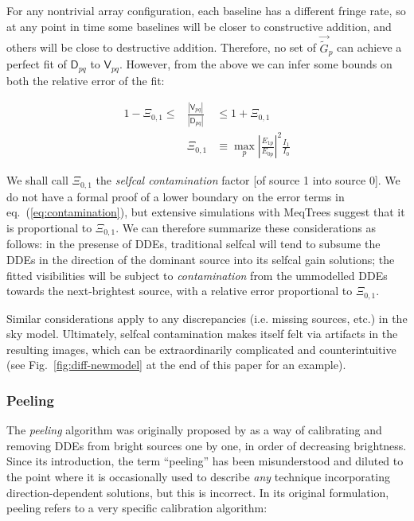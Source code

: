 \documentclass[]{aa}
\newcommand{\jones}[2]{\vec {#1}_{#2}}
\newcommand{\coh}[2]{\mathsf{{#1}}_{{#2}}}
\begin{document}
For any nontrivial array configuration, each baseline has a different fringe rate, so at any point in time some baselines will be closer to constructive addition, and others will be close to destructive addition. Therefore, no set of
$\jones{\tilde G}{p}$ can achieve a perfect fit of $\coh{D}{pq}$ to $\coh{V}{pq}$. However, from the above we can infer some bounds on both the relative error of the fit:

\begin{eqnarray}\label{eq:contamination}
1 -\Xi_{0,1} \le & { \displaystyle \frac{|\coh{V}{pq}|}{|\coh{D}{pq}|} } & \le 1 + \Xi_{0,1} \\
\nonumber & \Xi_{0,1} & \equiv \max_p \left| \frac{E_{1p}}{E_{0p}} \right|^2\frac{I_1}{I_0}
\end{eqnarray}

We shall call $\Xi_{0,1}$ the \emph{selfcal contamination} factor [of source 1 into source 0]. We do not have a formal proof of a lower boundary on the error terms in eq.~(\ref{eq:contamination}), but extensive simulations with MeqTrees suggest that it is proportional to $\Xi_{0,1}$. We can therefore summarize these considerations as follows: in the presense of DDEs, traditional selfcal will tend to subsume the DDEs in the direction of the dominant source into its selfcal gain solutions; the fitted visibilities will be subject to \emph{contamination} from the ummodelled DDEs towards the next-brightest source, with a relative error proportional to $\Xi_{0,1}$.

Similar considerations apply to any discrepancies (i.e. missing sources, etc.) in the sky model. Ultimately, selfcal contamination makes itself felt via artifacts in the resulting images, which can be extraordinarily complicated and counterintuitive (see Fig.~\ref{fig:diff-newmodel} at the end of this paper for an example).

\subsubsection{Peeling\label{sec:peeling}}

The \emph{peeling} algorithm was originally proposed by \citet{JEN:peeling} as a way of calibrating and removing DDEs from bright sources one by one, in order of decreasing brightness. Since its introduction, the term ``peeling'' has been misunderstood and diluted to the point where it is occasionally used to describe {\em any} technique incorporating direction-dependent solutions, but this is incorrect. In its original formulation, peeling refers to a very specific calibration algorithm:
\end{document}
